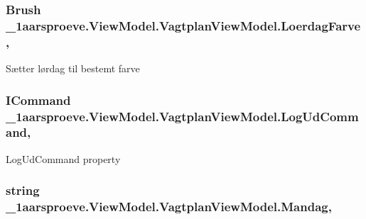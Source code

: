 \subsubsection[{Loerdag\+Farve}]{\setlength{\rightskip}{0pt plus 5cm}Brush \+\_\+1aarsproeve.\+View\+Model.\+Vagtplan\+View\+Model.\+Loerdag\+Farve\hspace{0.3cm}{\ttfamily [get]}, {\ttfamily [set]}}\label{class__1aarsproeve_1_1_view_model_1_1_vagtplan_view_model_a185e3bddfb80d3f012af638b27bbf99a}


Sætter lørdag til bestemt farve 

\hypertarget{class__1aarsproeve_1_1_view_model_1_1_vagtplan_view_model_aadc2e0233944328d65644e49b449f89b}{}
\subsubsection[{Log\+Ud\+Command}]{\setlength{\rightskip}{0pt plus 5cm}I\+Command \+\_\+1aarsproeve.\+View\+Model.\+Vagtplan\+View\+Model.\+Log\+Ud\+Command\hspace{0.3cm}{\ttfamily [get]}, {\ttfamily [set]}}\label{class__1aarsproeve_1_1_view_model_1_1_vagtplan_view_model_aadc2e0233944328d65644e49b449f89b}


Log\+Ud\+Command property 

\hypertarget{class__1aarsproeve_1_1_view_model_1_1_vagtplan_view_model_aa78a723e55f22d0579a6a5cc0086a2fc}{}
\subsubsection[{Mandag}]{\setlength{\rightskip}{0pt plus 5cm}string \+\_\+1aarsproeve.\+View\+Model.\+Vagtplan\+View\+Model.\+Mandag\hspace{0.3cm}{\ttfamily [get]}, {\ttfamily [set]}}\label{class__1aarsproeve_1_1_view_model_1_1_vagtplan_view_model_aa78a723e55f22d0579a6a5cc0086a2fc}


